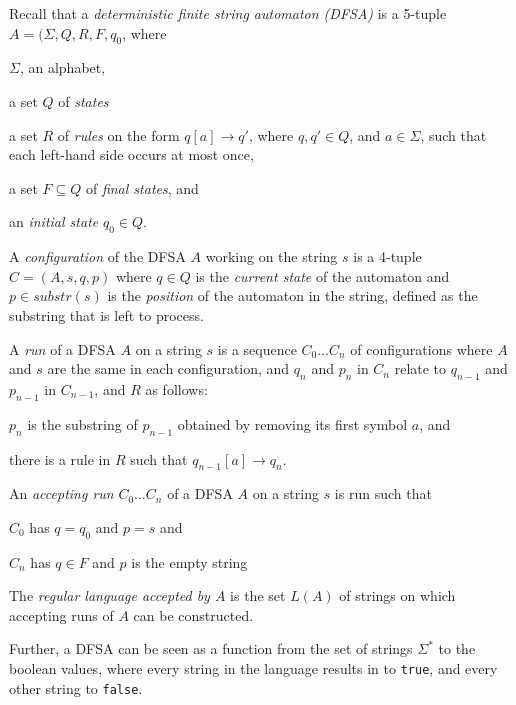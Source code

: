 Recall that a \emph{deterministic finite string automaton (DFSA)} is a
5-tuple $A = (\Sigma, Q, R, F, q_0$, where
\begin{compactitem}
\item $\Sigma$, an alphabet,
\item a set $Q$ of \emph{states}
\item a set $R$ of \emph{rules} on the form
	$q[a] \rightarrow q'$, where $q, q' \in Q$, and $a \in \Sigma$, such
	that each left-hand side occurs at most once, 
\item a set $F \subseteq Q$ of \emph{final states}, and
\item an \emph{initial state} $q_0 \in Q$.
\end{compactitem}

A \emph{configuration} of the DFSA $A$ working on the string $s$ is a 4-tuple
$C = (A, s, q, p)$ where $q \in Q$ is the \emph{current state} of the
automaton and $p \in substr(s)$ is the \emph{position} of the automaton in
the string, defined as the substring that is left to process.

A \emph{run} of a DFSA $A$ on a string $s$ is a sequence $C_0 \ldots C_n$ of
configurations where $A$ and $s$ are the same in each configuration, and
$q_n$ and $p_n$ in $C_n$ relate to $q_{n-1}$ and $p_{n-1}$ in $C_{n-1}$,
and $R$ as follows:
\begin{compactitem}
\item $p_n$ is the substring of $p_{n-1}$ obtained by removing its first symbol
$a$, and
\item there is a rule in $R$ such that
$q_{n-1}[a] \rightarrow q_n$.
\end{compactitem}
\vspace{0.5cm}

An \emph{accepting run} $C_0 \ldots C_n$ of a DFSA $A$ on a string $s$ is run such that
\begin{compactitem}
\item $C_0$ has $q = q_0$ and $p = s$ and
\item $C_n$ has $q \in F$ and $p$ is the empty string
\end{compactitem}
\vspace{0.5cm}

The \emph{regular language accepted by $A$} is the set $L(A)$ of strings on
which accepting runs of $A$ can be constructed.

Further, a DFSA can be seen as a function from the set of strings
$\Sigma^*$ to the boolean values, where every string in the language
results in to \texttt{true}, and every other string to \texttt{false}.

